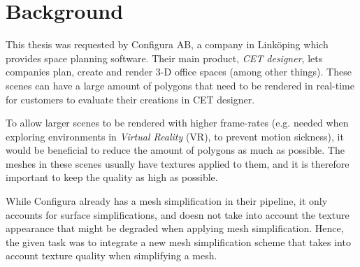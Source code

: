\section{Background}
\label{sec:background}

This thesis was requested by Configura AB, a company in Linköping which provides space planning software. Their main product, \emph{CET designer}, lets companies plan, create and render 3-D office spaces (among other things). These scenes can have a large amount of polygons that need to be rendered in real-time for customers to evaluate their creations in CET designer.

To allow larger scenes to be rendered with higher frame-rates (e.g. needed when exploring environments in \emph{Virtual Reality} (VR), to prevent motion sickness), it would be beneficial to reduce the amount of polygons as much as possible. The meshes in these scenes usually have textures applied to them, and it is therefore important to keep the quality as high as possible.

While Configura already has a mesh simplification in their pipeline, it only accounts for surface simplifications, and doesn not take into account the texture appearance that might be degraded when applying mesh simplification. Hence, the given task was to integrate a new mesh simplification scheme that takes into account texture quality when simplifying a mesh.



